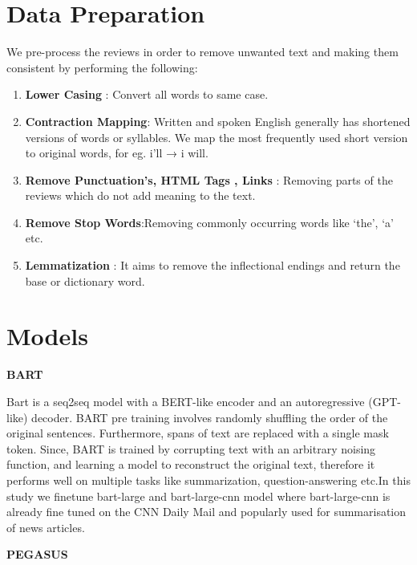 \documentclass{article}
\begin{document}
\begin{appendices}
\section{Data Preparation}
We pre-process the reviews in order to remove unwanted text and making them consistent by performing the following:
\begin{enumerate}
\item {\textbf{Lower Casing} : Convert all words to same case.}
\item {\textbf{Contraction Mapping}: Written and spoken English generally has shortened versions of words or syllables. We map the most frequently used short version to original words, for eg. i’ll → i will. }
\item {\textbf{Remove Punctuation's, HTML Tags , Links} : Removing parts of the reviews which do not add meaning to the text.}
\item {\textbf{Remove Stop Words}:Removing commonly occurring words like ‘the’, ‘a’ etc.}
\item {\textbf{Lemmatization} : It aims to remove the inflectional endings and return the base or dictionary word.}
\end{enumerate}

\section{Models}
\textbf{BART}

Bart \cite{bart} is a  seq2seq model with a BERT-like encoder and an autoregressive (GPT-like) decoder. BART pre training involves randomly shuffling the order of the original sentences. Furthermore, spans of text are replaced with a single mask token. Since, BART is trained by corrupting text with an arbitrary noising function, and learning a model to reconstruct the original text, therefore it performs well on multiple tasks like summarization, question-answering etc.In this study we finetune bart-large and bart-large-cnn model where bart-large-cnn is already fine tuned on the CNN Daily Mail and popularly used for summarisation of news articles.

\textbf{PEGASUS}


\end{appendices}
\end{document}
